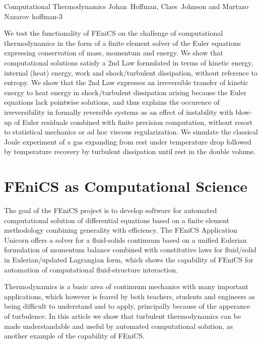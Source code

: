               {Computational Thermodynamics}
              {Johan~Hoffman, Claes~Johnson and Murtazo Nazarov}
              {hoffman-3}


We test the functionality of FEniCS on the challenge of computational
thermodynamics in the form of a finite element solver of the Euler
equations expressing conservation of mass, momentum and energy. We
show that computational solutions satisfy a 2nd Law formulated in
terms of kinetic energy, internal (heat) energy, work and
shock/turbulent dissipation, without reference to entropy. We show
that the 2nd Law
expresses an irreversible transfer of kinetic energy to heat energy in
shock/turbulent dissipation arising because the Euler equations lack
pointwise solutions, and thus explains the occurence of
irreversibility in formally reversible systems as an effect of
instability with blow-up of Euler residuals combined with finite
precision computation, without resort to statistical mechanics or ad
hoc viscous regularization.
We simulate the classical Joule experiment of a gas expanding from
rest under temperature drop followed by temperature recovery by
turbulent dissipation until rest in the double volume.
 
\section{FEniCS as Computational Science}

The goal of the FEniCS project is to develop software for automated
computational solution of differential equations based on a finite
element methodology combining generality with efficiency. The FEniCS
Application Unicorn offers a solver for a fluid-solids continuum based
on a unified Eulerian formulation of momentum balance combined with
constitutive laws for fluid/solid in Eulerian/updated Lagrangian form,
which shows the capability of FEniCS for automation of computational
fluid-structure interaction.

Thermodynamics is a basic area of continuum mechanics with many
important applications, which however is feared by both teachers,
students and engineers as being difficult to understand and to apply,
principally because of the apperance of turbulence. In this article we
show that turbulent thermodynamics can be made understandable and
useful by automated computational solution, as another example of the
capability of FEniCS.

